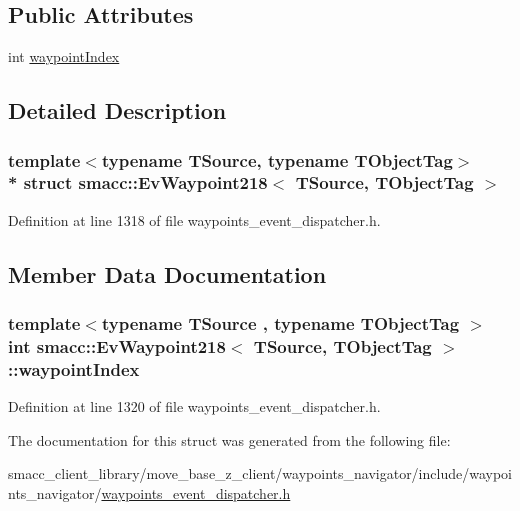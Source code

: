 \subsection*{Public Attributes}
\begin{DoxyCompactItemize}
\item 
int \hyperlink{structsmacc_1_1EvWaypoint218_ad05e208bde7a206712d41c9b7da50783}{waypoint\+Index}
\end{DoxyCompactItemize}


\subsection{Detailed Description}
\subsubsection*{template$<$typename T\+Source, typename T\+Object\+Tag$>$\\*
struct smacc\+::\+Ev\+Waypoint218$<$ T\+Source, T\+Object\+Tag $>$}



Definition at line 1318 of file waypoints\+\_\+event\+\_\+dispatcher.\+h.



\subsection{Member Data Documentation}
\subsubsection[{\texorpdfstring{waypoint\+Index}{waypointIndex}}]{\setlength{\rightskip}{0pt plus 5cm}template$<$typename T\+Source , typename T\+Object\+Tag $>$ int {\bf smacc\+::\+Ev\+Waypoint218}$<$ T\+Source, T\+Object\+Tag $>$\+::waypoint\+Index}\hypertarget{structsmacc_1_1EvWaypoint218_ad05e208bde7a206712d41c9b7da50783}{}\label{structsmacc_1_1EvWaypoint218_ad05e208bde7a206712d41c9b7da50783}


Definition at line 1320 of file waypoints\+\_\+event\+\_\+dispatcher.\+h.



The documentation for this struct was generated from the following file\+:\begin{DoxyCompactItemize}
\item 
smacc\+\_\+client\+\_\+library/move\+\_\+base\+\_\+z\+\_\+client/waypoints\+\_\+navigator/include/waypoints\+\_\+navigator/\hyperlink{waypoints__event__dispatcher_8h}{waypoints\+\_\+event\+\_\+dispatcher.\+h}\end{DoxyCompactItemize}
